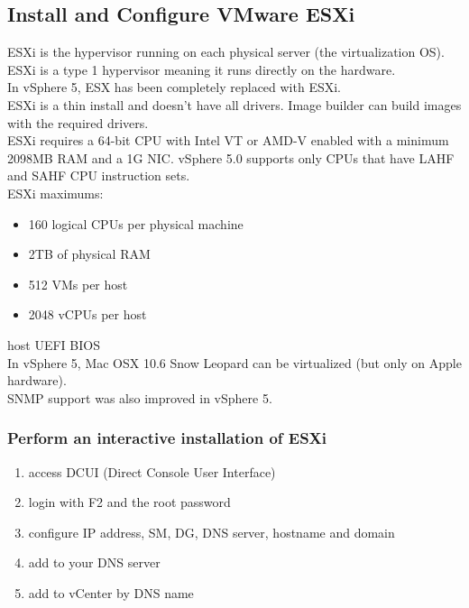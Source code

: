 \subsection{Install and Configure VMware ESXi}

ESXi is the hypervisor running on each physical server (the virtualization
OS). ESXi is a type 1 hypervisor meaning it runs directly on the hardware.\\

In vSphere 5, ESX has been completely replaced with ESXi.\\

ESXi is a thin install and doesn't have all drivers. Image builder can build
images with the required drivers.\\

ESXi requires a 64-bit CPU with Intel VT or AMD-V enabled with a minimum
2098MB RAM and a 1G NIC. vSphere 5.0 supports only CPUs that have LAHF and
SAHF CPU instruction sets.\\

ESXi maximums:

\begin{itemize}

\item 160 logical CPUs per physical machine
\item 2TB of physical RAM
\item 512 VMs per host
\item 2048 vCPUs per host

\end{itemize}

host UEFI BIOS\\

In vSphere 5, Mac OSX 10.6 Snow Leopard can be virtualized (but only on Apple
hardware).\\

SNMP support was also improved in vSphere 5.

\subsubsection{Perform an interactive installation of ESXi}

\begin{enumerate}
\item access DCUI (Direct Console User Interface)
\item login with F2 and the root password
\item configure IP address, SM, DG, DNS server, hostname and domain
\item add to your DNS server
\item add to vCenter by DNS name
\end{enumerate}

